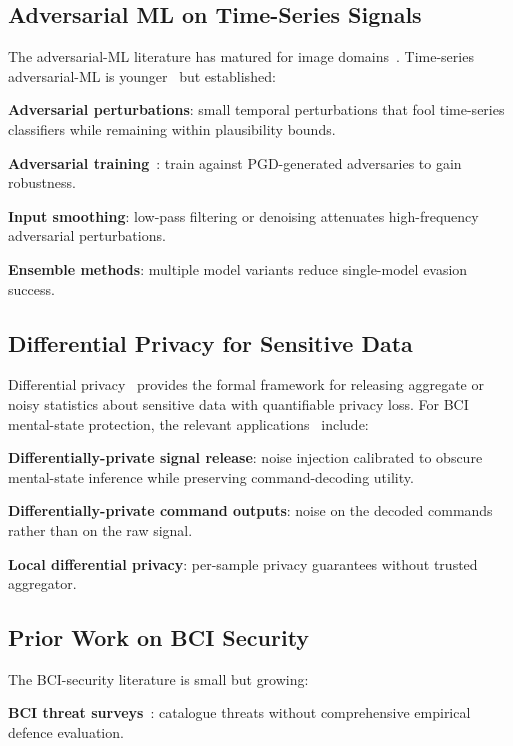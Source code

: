 \documentclass[sigconf,nonacm]{acmart}
\begin{document}
\subsection{Adversarial ML on Time-Series Signals}

The adversarial-ML literature has matured for image
domains~\cite{biggio2018wild,goodfellow2014fgsm,madry2018towards,
carlini2017cw}. Time-series adversarial-ML is
younger~\cite{karimi2024timeseriesadv,sagduyu2024advcomm} but
established:

\textbf{Adversarial perturbations}: small temporal perturbations
that fool time-series classifiers while remaining within
plausibility bounds.

\textbf{Adversarial training}~\cite{madry2018towards}: train against
PGD-generated adversaries to gain robustness.

\textbf{Input smoothing}: low-pass filtering or denoising
attenuates high-frequency adversarial perturbations.

\textbf{Ensemble methods}: multiple model variants reduce
single-model evasion success.

\subsection{Differential Privacy for Sensitive Data}

Differential privacy~\cite{dwork2006dp,abadi2016deep} provides the
formal framework for releasing aggregate or noisy statistics about
sensitive data with quantifiable privacy loss. For BCI mental-state
protection, the relevant
applications~\cite{ji2024dpneural,song2024neuralprivacy} include:

\textbf{Differentially-private signal release}: noise injection
calibrated to obscure mental-state inference while preserving
command-decoding utility.

\textbf{Differentially-private command outputs}: noise on the
decoded commands rather than on the raw signal.

\textbf{Local differential privacy}: per-sample privacy guarantees
without trusted aggregator.

\subsection{Prior Work on BCI Security}

The BCI-security literature is small but growing:

\textbf{BCI threat surveys}~\cite{ienca2024neurorights,
chizeck2024bcithreat}: catalogue threats without comprehensive
empirical defence evaluation.
\end{document}
